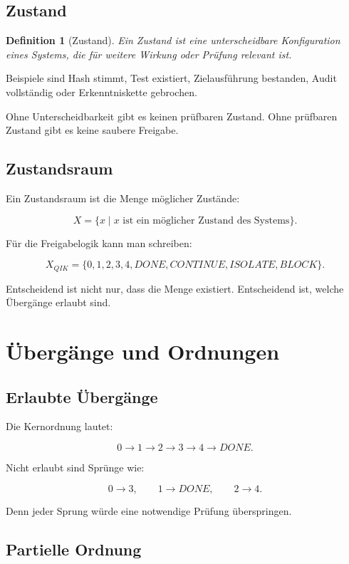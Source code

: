 \documentclass[11pt,a4paper,oneside]{book}
\newtheorem{definition}{Definition}[chapter]
\begin{document}
\section{Zustand}

\begin{definition}[Zustand]
Ein Zustand ist eine unterscheidbare Konfiguration eines Systems, die für weitere Wirkung oder Prüfung relevant ist.
\end{definition}

Beispiele sind Hash stimmt, Test existiert, Zielausführung bestanden, Audit vollständig oder Erkenntniskette gebrochen.

Ohne Unterscheidbarkeit gibt es keinen prüfbaren Zustand. Ohne prüfbaren Zustand gibt es keine saubere Freigabe.

\section{Zustandsraum}

Ein Zustandsraum ist die Menge möglicher Zustände:

\[
X=\{x\mid x \text{ ist ein möglicher Zustand des Systems}\}.
\]

Für die Freigabelogik kann man schreiben:

\[
X_{QIK}=\{0,1,2,3,4,DONE,CONTINUE,ISOLATE,BLOCK\}.
\]

Entscheidend ist nicht nur, dass die Menge existiert. Entscheidend ist, welche Übergänge erlaubt sind.

\chapter{Übergänge und Ordnungen}

\section{Erlaubte Übergänge}

Die Kernordnung lautet:

\[
0\rightarrow 1\rightarrow 2\rightarrow 3\rightarrow 4\rightarrow DONE.
\]

Nicht erlaubt sind Sprünge wie:

\[
0\rightarrow 3, \qquad 1\rightarrow DONE, \qquad 2\rightarrow 4.
\]

Denn jeder Sprung würde eine notwendige Prüfung überspringen.

\section{Partielle Ordnung}
\end{document}
